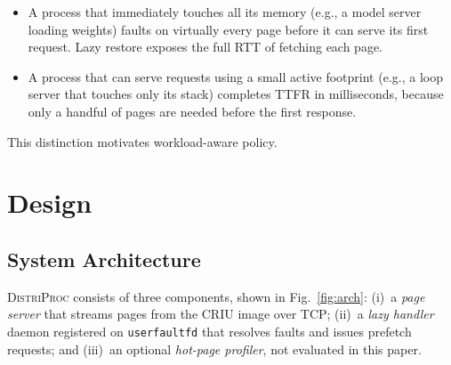 \documentclass[journal]{IEEEtran}
\newcommand{\distriproc}{\textsc{DistriProc}\xspace}
\newcommand{\uffd}{\texttt{userfaultfd}\xspace}
\begin{document}
\begin{itemize}
\item A process that immediately touches all its memory (e.g., a model
server loading weights) faults on virtually every page before it can serve
its first request. Lazy restore exposes the full RTT of fetching each page.

\item A process that can serve requests using a small active footprint
(e.g., a loop server that touches only its stack) completes TTFR in
milliseconds, because only a handful of pages are needed before the first
response.
\end{itemize}

This distinction motivates workload-aware policy.

\section{Design}
\label{sec:design}

\subsection{System Architecture}
\label{sec:arch}

\distriproc consists of three components, shown in
Fig.~\ref{fig:arch}: (i)~a \emph{page server} that streams pages from the
CRIU image over TCP; (ii)~a \emph{lazy handler} daemon registered on \uffd
that resolves faults and issues prefetch requests; and (iii)~an optional
\emph{hot-page profiler}, not evaluated in this paper.
\end{document}
